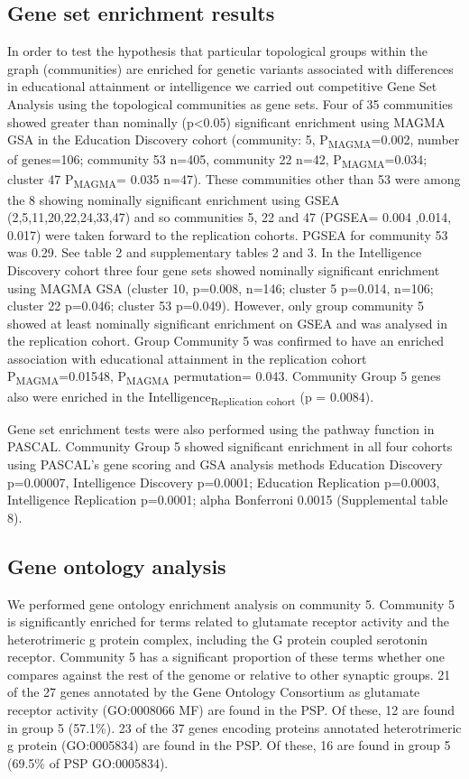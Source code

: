 \subsection{Gene set enrichment results}
In order to test the hypothesis that particular topological groups within the graph (communities) are enriched for genetic variants associated with differences in educational attainment or intelligence we carried out competitive Gene Set Analysis using the topological communities as gene sets. 
Four of 35 communities showed greater than nominally (p<0.05) significant enrichment using MAGMA GSA in the Education Discovery cohort (community: 5, P\textsubscript{MAGMA}=0.002, number of genes=106; community 53 n=405, community 22 n=42, P\textsubscript{MAGMA}=0.034; cluster 47 P\textsubscript{MAGMA}= 0.035 n=47). These communities other than 53 were among the 8 showing nominally significant enrichment using GSEA (2,5,11,20,22,24,33,47) and so communities 5, 22 and 47 (PGSEA= 0.004 ,0.014, 0.017) were taken forward to the replication cohorts. PGSEA for community 53 was 0.29. See table 2 and supplementary tables 2 and 3.
In the Intelligence Discovery cohort three four gene sets showed nominally significant enrichment using MAGMA GSA (cluster 10, p=0.008, n=146; cluster 5 p=0.014, n=106; cluster 22 p=0.046; cluster 53 p=0.049). However, only group community 5 showed at least nominally significant enrichment on GSEA and was analysed in the replication cohort. 
Group Community 5 was confirmed to have an enriched association with educational attainment in the replication cohort P\textsubscript{MAGMA}=0.01548, P\textsubscript{MAGMA} permutation= 0.043. Community Group 5 genes also were enriched in the Intelligence\textsubscript{Replication cohort} (p = 0.0084).

Gene set enrichment tests were also performed using the pathway function in PASCAL.\cite{lamparter2016fast} Community Group 5 showed significant enrichment in all four cohorts using PASCAL’s gene scoring and GSA analysis methods Education Discovery p=0.00007, Intelligence Discovery p=0.0001; Education Replication p=0.0003, Intelligence Replication p=0.0001; alpha Bonferroni 0.0015 (Supplemental table 8). 

\subsection{Gene ontology analysis}
\label{sec: spectral group 5 analysis}
We performed gene ontology enrichment analysis on community  5. Community 5 is significantly enriched for terms related to glutamate receptor activity and the heterotrimeric g protein complex, including the G protein coupled serotonin receptor. Community 5 has a significant proportion of these terms whether one compares against the rest of the genome or relative to other synaptic groups. 21 of the 27 genes annotated by the Gene Ontology Consortium as
glutamate receptor activity (GO:0008066 MF) are found in the PSP. Of these, 12 are found in group 5 (57.1\%). 
23 of the 37 genes encoding proteins annotated heterotrimeric g protein (GO:0005834) are found in the PSP. Of these, 16 are found in group 5 (69.5\% of PSP GO:0005834). 

